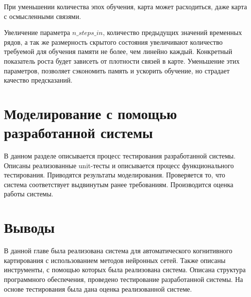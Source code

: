 
При уменьшении количества эпох обучения, карта может расходиться, даже карта с осмысленными связями.

Увеличение параметра $ n\_steps\_in $, количество предыдущих значений временных рядов,
а так же размерность скрытого состояния увеличивают количество требуемой для обучения
памяти не более, чем линейно каждый. Конкретный показатель роста будет зависеть от
плотности связей в карте.
Уменьшение этих параметров, позволяет сэкономить память и ускорить обучение,
но страдает качество предсказаний.


\section{Моделирование с помощью разработанной системы}
\begin{annotation}
	В данном разделе описывается процесс тестирования разработанной системы.
	Описаны реализованные unit-тесты и описывается процесс функционального тестирования.
	Приводятся результаты моделирования. Проверяется то, что система соответствует выдвинутым ранее требованиям.
	Производится оценка работы системы.
\end{annotation}

\section{Выводы}

В данной главе была реализована система для автоматического когнитивного картирования с использованием
методов нейронных сетей.
Также описаны инструменты, с помощью которых была реализована система.
Описана структура программного обеспечения, проведено тестирование разработанной системы.
На основе тестирования была дана оценка реализованной системе.


